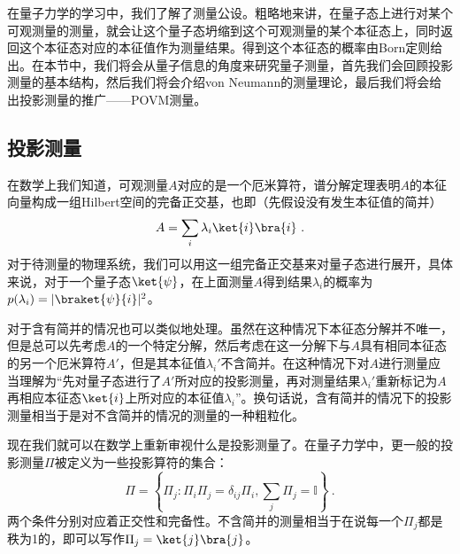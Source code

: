 

在量子力学的学习中，我们了解了测量公设。粗略地来讲，在量子态上进行对某个可观测量的测量，就会让这个量子态坍缩到这个可观测量的某个本征态上，同时返回这个本征态对应的本征值作为测量结果。得到这个本征态的概率由Born定则给出。在本节中，我们将会从量子信息的角度来研究量子测量，首先我们会回顾投影测量的基本结构，然后我们将会介绍von Neumann的测量理论，最后我们将会给出投影测量的推广——POVM测量。

\subsection{投影测量}

在数学上我们知道，可观测量$A$对应的是一个厄米算符，谱分解定理表明$A$的本征向量构成一组Hilbert空间的完备正交基，也即（先假设没有发生本征值的简并）
\begin{equation}
A=\sum_i\lambda_i\ket{i}\bra{i}~.
\end{equation}
对于待测量的物理系统，我们可以用这一组完备正交基来对量子态进行展开，具体来说，对于一个量子态$\ket{\psi}$，在上面测量$A$得到结果$\lambda_i$的概率为$p(\lambda_i)=|\braket{\psi}{i}|^2$。

对于含有简并的情况也可以类似地处理。虽然在这种情况下本征态分解并不唯一，但是总可以先考虑$A$的一个特定分解，然后考虑在这一分解下与$A$具有相同本征态的另一个厄米算符$A'$，但是其本征值$\lambda_i'$不含简并。在这种情况下对$A$进行测量应当理解为“先对量子态进行了$A'$所对应的投影测量，再对测量结果$\lambda_i'$重新标记为$A$再相应本征态$\ket{i}$上所对应的本征值$\lambda_i$”。换句话说，含有简并的情况下的投影测量相当于是对不含简并的情况的测量的一种粗粒化。

现在我们就可以在数学上重新审视什么是投影测量了。在量子力学中，更一般的投影测量$\Pi$被定义为一些投影算符的集合：
$$
\Pi=\left\{\Pi_j: \Pi_i \Pi_j=\delta_{i j} \Pi_i, \sum_j \Pi_j=\mathbb{I}\right\}~.
$$
两个条件分别对应着正交性和完备性。不含简并的测量相当于在说每一个$\Pi_j$都是秩为1的，即可以写作$\Pi_j=\ket{j}\bra{j}$。

